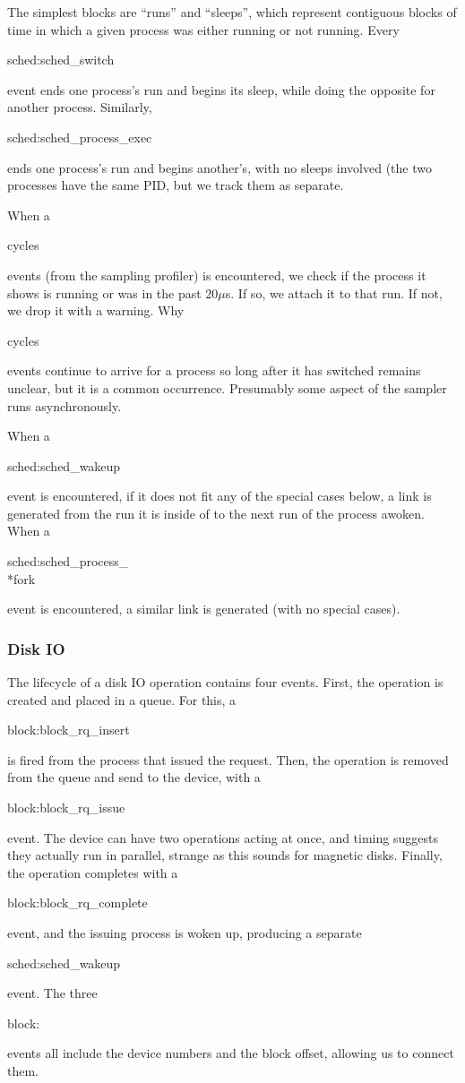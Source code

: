 \documentclass[10pt]{article}
\begin{document}
The simplest blocks are ``runs'' and ``sleeps'', which represent contiguous blocks of time in which a given process was either running or not running.  Every \begin{tt}sched:sched\_switch\end{tt} event ends one process's run and begins its sleep, while doing the opposite for another process.  Similarly, \begin{tt}sched:sched\_process\_exec\end{tt} ends one process's run and begins another's, with no sleeps involved (the two processes have the same PID, but we track them as separate.

When a \begin{tt}cycles\end{tt} events (from the sampling profiler) is encountered, we check if the process it shows is running or was in the past $20 \mu$s.  If so, we attach it to that run.  If not, we drop it with a warning.  Why \begin{tt}cycles\end{tt} events continue to arrive for a process so long after it has switched remains unclear, but it is a common occurrence.  Presumably some aspect of the sampler runs asynchronously.

When a \begin{tt}sched:sched\_wakeup\end{tt} event is encountered, if it does not fit any of the special cases below, a link is generated from the run it is inside of to the next run of the process awoken.  When a \begin{tt}sched:sched\_process\_\\*fork\end{tt} event is encountered, a similar link is generated (with no special cases).

\subsubsection{Disk IO}

The lifecycle of a disk IO operation contains four events.  First, the operation is created and placed in a queue.  For this, a \begin{tt}block:block\_rq\_insert\end{tt} is fired from the process that issued the request.  Then, the operation is removed from the queue and send to the device, with a \begin{tt}block:block\_rq\_issue\end{tt} event.  The device can have two operations acting at once, and timing suggests they actually run in parallel, strange as this sounds for magnetic disks.  Finally, the operation completes with a \begin{tt}block:block\_rq\_complete\end{tt} event, and the issuing process is woken up, producing a separate \begin{tt}sched:sched\_wakeup\end{tt} event.  The three \begin{tt}block:\end{tt} events all include the device numbers and the block offset, allowing us to connect them.
\end{document}
